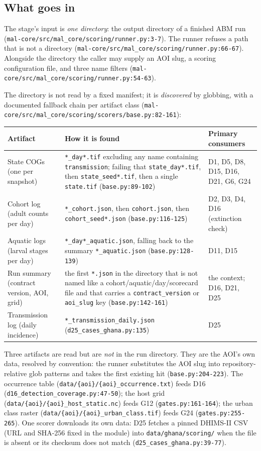\documentclass[11pt,a4paper]{article}
\newcommand{\code}[1]{\texttt{#1}}
\begin{document}
\subsection{What goes in}

The stage's input is \emph{one directory}: the output directory of a
finished ABM run
(\code{mal-core/src/mal\_core/scoring/runner.py:3-7}). The runner refuses a
path that is not a directory
(\code{mal-core/src/mal\_core/scoring/runner.py:66-67}). Alongside the
directory the caller may supply an AOI slug, a scoring configuration file,
and three name filters
(\code{mal-core/src/mal\_core/scoring/runner.py:54-63}).

The directory is not read by a fixed manifest; it is \emph{discovered} by
globbing, with a documented fallback chain per artifact class
(\code{mal-core/src/mal\_core/scoring/scorers/base.py:82-161}):

\begin{longtable}{@{}p{3.4cm}p{8.6cm}p{3.2cm}@{}}
\toprule
Artifact & How it is found & Primary consumers \\
\midrule
\endhead
State COGs (one per snapshot) & \code{*\_day*.tif} excluding any name
containing \code{transmission}; failing that \code{state\_day*.tif}, then
\code{state\_seed*.tif}, then a single \code{state.tif}
(\code{base.py:89-102}) & D1, D5, D8, D15, D16, D21, G6, G24 \\
Cohort log (adult counts per day) & \code{*\_cohort.json}, then
\code{cohort.json}, then \code{cohort\_seed*.json}
(\code{base.py:116-125}) & D2, D3, D4, D16 (extinction check) \\
Aquatic logs (larval stages per day) & \code{*\_day*\_aquatic.json}, falling
back to the summary \code{*\_aquatic.json}
(\code{base.py:128-139}) & D11, D15 \\
Run summary (contract version, AOI, grid) & the first \code{*.json} in the
directory that is not named like a cohort/aquatic/day/scorecard file and
that carries a \code{contract\_version} or \code{aoi\_slug} key
(\code{base.py:142-161}) & the context; D16, D21, D25 \\
Transmission log (daily incidence) & \code{*\_transmission\_daily.json}
(\code{d25\_cases\_ghana.py:135}) & D25 \\
\end{longtable}

Three artifacts are read but are \emph{not} in the run directory. They are the
AOI's own data, resolved by convention: the runner substitutes the AOI slug
into repository-relative glob patterns and takes the first existing hit
(\code{base.py:204-223}). The occurrence table
(\code{data/\{aoi\}/\{aoi\}\_occurrence.txt}) feeds D16
(\code{d16\_detection\_coverage.py:47-50}); the host grid
(\code{data/\{aoi\}/\{aoi\}\_host\_static.nc}) feeds G12
(\code{gates.py:161-164}); the urban class raster
(\code{data/\{aoi\}/\{aoi\}\_urban\_class.tif}) feeds G24
(\code{gates.py:255-265}). One scorer downloads its own data: D25 fetches a
pinned DHIMS-II CSV (URL and SHA-256 fixed in the module) into
\code{data/ghana/scoring/} when the file is absent or its checksum does not
match (\code{d25\_cases\_ghana.py:39-77}).
\end{document}

